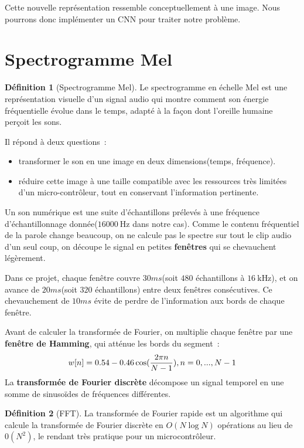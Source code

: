 \documentclass[a4paper,12pt,twoside]{report}
\theoremstyle{definition}
\newtheorem{defi}{Définition}
\theoremstyle{plain}
\theoremstyle{remark}
\begin{document}
Cette nouvelle représentation ressemble conceptuellement à une image. Nous pourrons donc implémenter un \ac{CNN} pour traiter notre problème. 

\section{Spectrogramme Mel}
\begin{defi}[Spectrogramme Mel]
	Le spectrogramme en échelle Mel est une représentation visuelle d'un signal audio qui montre comment son énergie fréquentielle évolue dans le temps, adapté à la façon dont l'oreille humaine perçoit les sons.
\end{defi}

Il répond à deux questions~:
\begin{itemize}
	\item transformer le son en une image en deux dimensions(temps, fréquence).
	\item réduire cette image à une taille compatible avec les ressources très limitées d'un micro-contrôleur, tout en conservant l'information pertinente.
\end{itemize}

Un son numérique est une suite d'échantillons prélevés à une fréquence d'échantillonnage donnée($\SI{16000}{\hertz}$ dans notre cas). Comme le contenu fréquentiel de la parole change beaucoup, on ne calcule pas le spectre sur tout le clip audio d'un seul coup, on découpe le signal en petites \textbf{fenêtres} qui se chevauchent légèrement.

Dans ce projet, chaque fenêtre couvre $30ms$(soit $480$ échantillons à $\SI{16}{\kilo\hertz}$), et on avance de $20ms$(soit $320$ échantillons) entre deux fenêtres consécutives. Ce chevauchement de $10ms$ évite de perdre de l'information aux bords de chaque fenêtre.

Avant de calculer la transformée de Fourier, on multiplie chaque fenêtre par une \textbf{fenêtre de Hamming}, qui atténue les bords du segment~:
\[w[n] = 0.54 - 0.46\cos(\frac{2\pi n}{N-1}), \large n=0,...,N-1\]
La \textbf{transformée de Fourier discrète} décompose un signal temporel en une somme de sinusoïdes de fréquences différentes.

\begin{defi}[\ac{FFT}]
    La transformée de Fourier rapide est un algorithme qui calcule la transformée de Fourier discrète en \textbf{$O(N\log N)$} opérations au lieu de \textbf{$0(N^2)$}, le rendant très pratique pour un microcontrôleur.
\end{defi}
\end{document}

